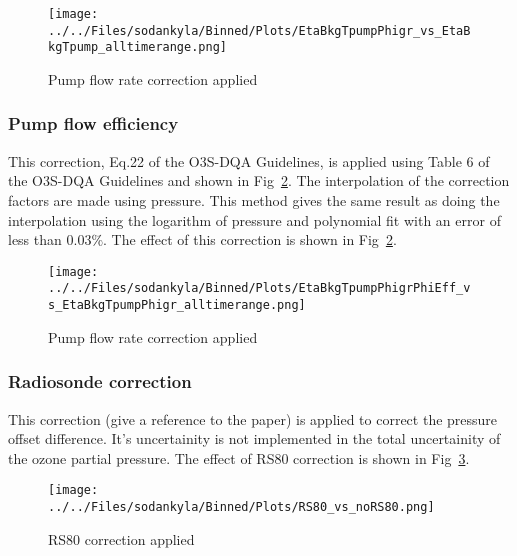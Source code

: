                         \begin{figure}
        \centering
\texttt{[image: ../../Files/sodankyla/Binned/Plots/EtaBkgTpumpPhigr\_vs\_EtaBkgTpump\_alltimerange.png]}
    \caption{Pump flow rate correction applied}
            \label{fig:pf_ptu}
    \end{figure}

                   \subsubsection{Pump flow efficiency}
    This correction, Eq.22 of the O3S-DQA Guidelines, is applied using Table 6 of the O3S-DQA Guidelines and shown in Fig~\ref{fig:pf_eff}.
The interpolation of the correction factors are made using pressure. This method gives the same result as doing the interpolation using the logarithm of pressure
and polynomial fit with an error of less than $0.03\%$. The effect of this correction is shown in Fig~\ref{fig:pf_eff}.

                        \begin{figure}
        \centering
\texttt{[image: ../../Files/sodankyla/Binned/Plots/EtaBkgTpumpPhigrPhiEff\_vs\_EtaBkgTpumpPhigr\_alltimerange.png]}
    \caption{Pump flow rate correction applied}
            \label{fig:pf_eff}
    \end{figure}

 \subsubsection{Radiosonde correction}
    This correction (give a reference to the paper) is applied to correct the pressure offset difference. It's uncertainity is not implemented in the
total uncertainity of the ozone partial pressure. The effect of RS80 correction is shown in Fig~\ref{fig:rs80}.

                        \begin{figure}
        \centering
\texttt{[image: ../../Files/sodankyla/Binned/Plots/RS80\_vs\_noRS80.png]}
    \caption{RS80 correction applied}
            \label{fig:rs80}
    \end{figure}


